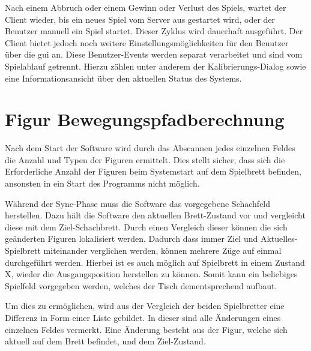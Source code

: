Nach einem Abbruch oder einem Gewinn oder Verlust des Spiels, wartet der
Client wieder, bis ein neues Spiel vom Server aus gestartet wird, oder
der Benutzer manuell ein Spiel startet. Dieser Zyklus wird dauerhaft
ausgeführt. Der Client bietet jedoch noch weitere
Einstellungsmöglichkeiten für den Benutzer über die \gls{gui} an. Diese
Benutzer-Events werden separat verarbeitet und sind vom Spielablauf
getrennt. Hierzu zählen unter anderem der Kalibrierungs-Dialog sowie
eine Informationsansicht über den aktuellen Status des Systems.

\hypertarget{figur-bewegungspfadberechnung}{%
\section{Figur
Bewegungspfadberechnung}\label{figur-bewegungspfadberechnung}}

Nach dem Start der Software wird durch das Abscannen jedes einzelnen
Feldes die Anzahl und Typen der Figuren ermittelt. Dies stellt sicher,
dass sich die Erforderliche Anzahl der Figuren beim Systemstart auf dem
Spielbrett befinden, ansonsten in ein Start des Programms nicht möglich.

Während der Sync-Phase muss die Software das vorgegebene Schachfeld
herstellen. Dazu hält die Software den aktuellen Brett-Zustand vor und
vergleicht diese mit dem Ziel-Schachbrett. Durch einen Vergleich dieser
können die sich geänderten Figuren lokalisiert werden. Dadurch dass
immer Ziel und Aktuelles-Spielbrett miteinander verglichen werden,
können mehrere Züge auf einmal durchgeführt werden. Hierbei ist es auch
möglich auf Spielbrett in einem Zustand X, wieder die Ausgangsposition
herstellen zu können. Somit kann ein beliebiges Spielfeld vorgegeben
werden, welches der Tisch dementsprechend aufbaut.

Um dies zu ermöglichen, wird aus der Vergleich der beiden Spielbretter
eine Differenz in Form einer Liste gebildet. In dieser sind alle
Änderungen eines einzelnen Feldes vermerkt. Eine Änderung besteht aus
der Figur, welche sich aktuell auf dem Brett befindet, und dem
Ziel-Zustand.


